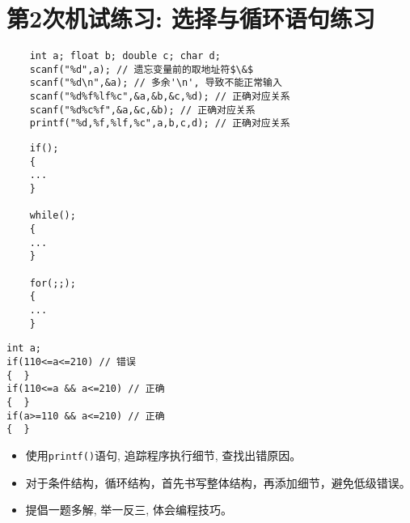 %
%
%
\chapter{第2次机试练习: 选择与循环语句练习}

\begin{note}
	\begin{lstlisting}
	int a; float b; double c; char d;
	scanf("%d",a); // 遗忘变量前的取地址符$\&$
	scanf("%d\n",&a); // 多余'\n', 导致不能正常输入
	scanf("%d%f%lf%c",&a,&b,&c,%d); // 正确对应关系
	scanf("%d%c%f",&a,&c,&b); // 正确对应关系
	printf("%d,%f,%lf,%c",a,b,c,d); // 正确对应关系
	\end{lstlisting}
\end{note}

\begin{note}
	\begin{lstlisting}
	if();
	{
	...
	}                 
	
	while();
	{
	...
	} 
	
	for(;;);
	{
	...
	}                  
	\end{lstlisting}
\end{note}

\newpage
\begin{note}[用C语言关系表达式准确表达数学含义]
\begin{lstlisting}
int a;
if(110<=a<=210) // 错误
{  }
if(110<=a && a<=210) // 正确 
{  }
if(a>=110 && a<=210) // 正确 
{  }
\end{lstlisting}	
\end{note}

\begin{note}[学习体会编程技巧]
	\begin{itemize}
		\item 使用\lstinline|printf()|语句, 追踪程序执行细节, 查找出错原因。
		\item 对于条件结构，循环结构，首先书写整体结构，再添加细节，避免低级错误。
		\item 提倡一题多解, 举一反三, 体会编程技巧。	
	\end{itemize}
\end{note}


